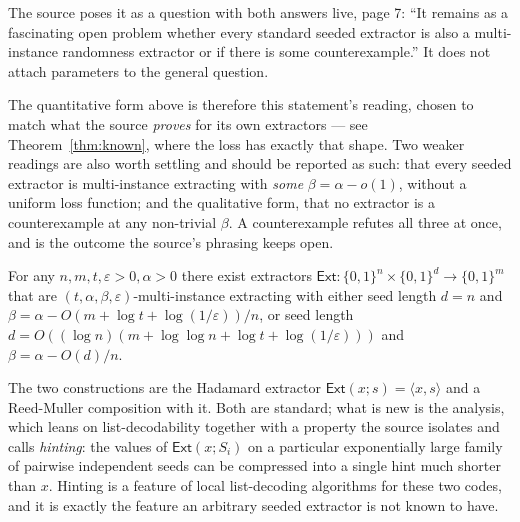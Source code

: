 \documentclass{aicr-conjecture}
\newcommand{\bits}{\{0,1\}}
\newcommand{\Ext}{\mathsf{Ext}}
\newcommand{\eps}{\varepsilon}
\begin{document}
\begin{remark}\label{rem:framing}
The source poses it as a question with both answers live, page 7: ``It
remains as a fascinating open problem whether every standard seeded
extractor is also a multi-instance randomness extractor or if there is
some counterexample.'' It does not attach parameters to the general
question.

The quantitative form above is therefore this statement's reading, chosen
to match what the source \emph{proves} for its own extractors --- see
Theorem~\ref{thm:known}, where the loss has exactly that shape. Two
weaker readings are also worth settling and should be reported as such:
that every seeded extractor is multi-instance extracting with
\emph{some} $\beta = \alpha - o(1)$, without a uniform loss function; and
the qualitative form, that no extractor is a counterexample at any
non-trivial $\beta$. A counterexample refutes all three at once, and is
the outcome the source's phrasing keeps open.
\end{remark}

\begin{theorem}\label{thm:known}
For any $n, m, t, \eps > 0, \alpha > 0$ there exist extractors
$\Ext : \bits^{n} \times \bits^{d} \to \bits^{m}$ that are
$(t,\alpha,\beta,\eps)$-multi-instance extracting with either seed length
$d = n$ and $\beta = \alpha - O(m + \log t + \log(1/\eps))/n$, or seed
length $d = O((\log n)(m + \log\log n + \log t + \log(1/\eps)))$ and
$\beta = \alpha - O(d)/n$.
\end{theorem}

The two constructions are the Hadamard extractor
$\Ext(x;s) = \langle x, s\rangle$ and a Reed-Muller composition with it.
Both are standard; what is new is the analysis, which leans on
list-decodability together with a property the source isolates and calls
\emph{hinting}: the values of $\Ext(x; S_i)$ on a particular exponentially
large family of pairwise independent seeds can be compressed into a single
hint much shorter than $x$. Hinting is a feature of local list-decoding
algorithms for these two codes, and it is exactly the feature an arbitrary
seeded extractor is not known to have.
\end{document}
